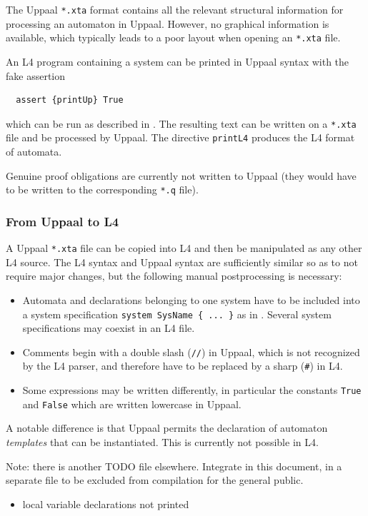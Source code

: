 The Uppaal \texttt{*.xta} format contains all the relevant structural
information for processing an automaton in Uppaal. However, no graphical
information is available, which typically leads to a poor layout when opening
an \texttt{*.xta} file.

An L4 program containing a system can be printed in Uppaal syntax with the
fake assertion
\begin{lstlisting}
  assert {printUp} True
\end{lstlisting}
which can be run as described in . The resulting
text can be written on a \texttt{*.xta} file and be processed by Uppaal. The
directive \texttt{printL4} produces the L4 format of automata.

Genuine proof obligations are currently not written to Uppaal (they would have
to be written to the corresponding \texttt{*.q} file).

\subsubsection{From Uppaal to L4}

A Uppaal \texttt{*.xta} file can be copied into L4 and then be manipulated as
any other L4 source. The L4 syntax and Uppaal syntax are sufficiently similar
so as to not require major changes, but the following manual postprocessing is
necessary:
\begin{itemize}
\item Automata and declarations belonging to one system have to be included
  into a system specification \texttt{system SysName \{ ... \}} as in
  . Several system specifications may coexist in an L4
  file.
\item Comments begin with a double slash (\texttt{//}) in Uppaal, which is not
  recognized by the L4 parser, and therefore have to be replaced by a sharp
  (\texttt{\#}) in L4.
\item Some expressions may be written differently, in particular the constants
  \texttt{True} and \texttt{False} which are written lowercase in Uppaal.
\end{itemize}

A notable difference is that Uppaal permits the declaration of automaton
\emph{templates} that can be instantiated. This is currently not possible in L4.



Note: there is another TODO file elsewhere. Integrate in this document, in a separate file to be excluded from compilation for the general public.
\begin{itemize}
\item local variable declarations not printed
\end{itemize}

